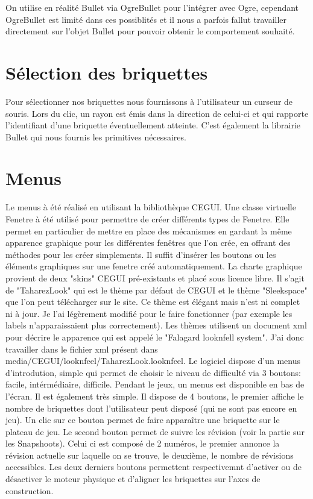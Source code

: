 \documentclass[frenchb,twoside]{EPURapport}
\begin{document}
        On utilise en réalité Bullet via OgreBullet pour l'intégrer avec Ogre,
        cependant OgreBullet est limité dans ces possiblités et il nous a
        parfois fallut travailler directement sur l'objet Bullet pour pouvoir
        obtenir le comportement souhaité. 

    \section{Sélection des briquettes}
        Pour sélectionner nos briquettes nous fournissons à l'utilisateur un
        curseur de souris. Lors du clic, un rayon est émis dans la direction de
        celui-ci et qui rapporte l'identifiant d'une briquette éventuellement
        atteinte. C'est également la librairie Bullet qui nous fournis les
        primitives nécessaires. 

    \section{Menus}
        Le menus à été réalisé en utilisant la bibliothèque CEGUI. Une classe
        virtuelle Fenetre à été utilisé pour permettre de créer différents
        types de Fenetre. Elle permet en particulier de mettre en place des
        mécanismes en gardant la même apparence graphique pour les différentes
        fenêtres que l'on crée, en offrant des méthodes pour les créer
        simplements. Il suffit d'insérer les boutons ou les éléments graphiques
        sur une fenetre créé automatiquement.
        La charte graphique provient de deux "skins" CEGUI pré-existants et
        placé sous licence libre. Il s'agit de "TaharezLook" qui est le thème
        par défaut de CEGUI et le thème "Sleekspace" que l'on peut télécharger
        sur le site. Ce thème est élégant mais n'est ni complet ni à jour. Je
        l'ai légèrement modifié pour le faire fonctionner (par exemple les
        labels n'apparaissaient plus correctement). Les thèmes utilisent un
        document xml pour décrire le apparence qui est appelé le "Falagard
        looknfell system". J'ai donc travailler dans le fichier xml présent
        dans media/CEGUI/looknfeel/TaharezLook.looknfeel.
        Le logiciel dispose d'un menus d'introdution, simple qui permet de
        choisir le niveau de difficulté via 3 boutons: facile, intérmédiaire,
        difficile.
        Pendant le jeux, un menus est disponible en bas de l'écran. Il est
        également très simple. Il dispose de 4 boutons, le premier affiche le
        nombre de briquettes dont l'utilisateur peut disposé (qui ne sont pas
        encore en jeu). Un clic sur ce bouton permet de faire apparaître une
        briquette sur le plateau de jeu. Le second bouton permet de suivre les
        révision (voir la partie sur les Snapshoots). Celui ci est composé de 2
        numéros, le premier annonce la révision actuelle sur laquelle on se
        trouve, le deuxième, le nombre de révisions accessibles. Les deux
        derniers boutons permettent respectivemnt d'activer ou de désactiver le
        moteur physique et d'aligner les briquettes sur l'axes de construction.
\end{document}
